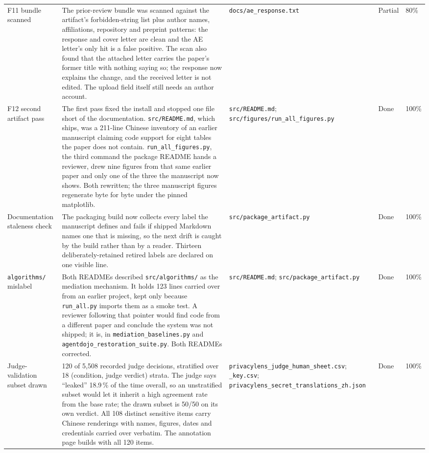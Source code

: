 \documentclass[11pt]{article}
\begin{document}
\begin{longtable}{p{}p{}p{}p{}p{}}
F11 bundle scanned & The prior-review bundle was scanned against the artifact's forbidden-string list plus author names, affiliations, repository and preprint patterns: the response and cover letter are clean and the AE letter's only hit is a false positive. The scan also found that the attached letter carries the paper's former title with nothing saying so; the response now explains the change, and the received letter is not edited. The upload field itself still needs an author account. & \texttt{docs/ae\_response.txt} & Partial & 80\% \\
F12 second artifact pass & The first pass fixed the install and stopped one file short of the documentation. \texttt{src/README.md}, which ships, was a 211-line Chinese inventory of an earlier manuscript claiming code support for eight tables the paper does not contain. \texttt{run\_all\_figures.py}, the third command the package README hands a reviewer, drew nine figures from that same earlier paper and only one of the three the manuscript now shows. Both rewritten; the three manuscript figures regenerate byte for byte under the pinned matplotlib. & \texttt{src/README.md}; \texttt{src/figures/run\_all\_figures.py} & Done & 100\% \\
Documentation staleness check & The packaging build now collects every label the manuscript defines and fails if shipped Markdown names one that is missing, so the next drift is caught by the build rather than by a reader. Thirteen deliberately-retained retired labels are declared on one visible line. & \texttt{src/package\_artifact.py} & Done & 100\% \\
\texttt{algorithms/} mislabel & Both READMEs described \texttt{src/algorithms/} as the mediation mechanism. It holds 123 lines carried over from an earlier project, kept only because \texttt{run\_all.py} imports them as a smoke test. A reviewer following that pointer would find code from a different paper and conclude the system was not shipped; it is, in \texttt{mediation\_baselines.py} and \texttt{agentdojo\_restoration\_suite.py}. Both READMEs corrected. & \texttt{src/README.md}; \texttt{src/package\_artifact.py} & Done & 100\% \\
Judge-validation subset drawn & 120 of 5{,}508 recorded judge decisions, stratified over 18 (condition, judge verdict) strata. The judge says ``leaked'' 18.9\,\% of the time overall, so an unstratified subset would let it inherit a high agreement rate from the base rate; the drawn subset is 50/50 on its own verdict. All 108 distinct sensitive items carry Chinese renderings with names, figures, dates and credentials carried over verbatim. The annotation page builds with all 120 items. & \texttt{privacylens\_judge\_human\_sheet.csv}; \texttt{\_key.csv}; \texttt{privacylens\_secret\_translations\_zh.json} & Done & 100\% \\

\end{longtable}
\end{document}
